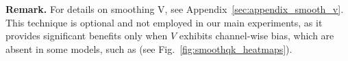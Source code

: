 \textbf{Remark.} For details on smoothing V, see Appendix~\ref{sec:appendix_smooth_v}. This technique is optional and not employed in our main experiments, as it provides significant benefits only when $V$ exhibits channel-wise bias, which are absent in some models, such as \llamal (see Fig.~\ref{fig:smoothqk_heatmaps}). 
